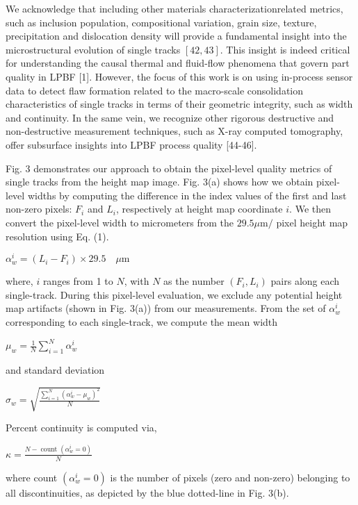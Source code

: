 \documentclass[10pt]{article}
\begin{document}
We acknowledge that including other materials characterizationrelated metrics, such as inclusion population, compositional variation, grain size, texture, precipitation and dislocation density will provide a fundamental insight into the microstructural evolution of single tracks $[42,43]$. This insight is indeed critical for understanding the causal thermal and fluid-flow phenomena that govern part quality in LPBF [1]. However, the focus of this work is on using in-process sensor data to detect flaw formation related to the macro-scale consolidation characteristics of single tracks in terms of their geometric integrity, such as width and continuity. In the same vein, we recognize other rigorous destructive and non-destructive measurement techniques, such as X-ray computed tomography, offer subsurface insights into LPBF process quality [44-46].

Fig. 3 demonstrates our approach to obtain the pixel-level quality metrics of single tracks from the height map image. Fig. 3(a) shows how we obtain pixel-level widths by computing the difference in the index values of the first and last non-zero pixels: $F_{i}$ and $L_{i}$, respectively at height map coordinate $i$. We then convert the pixel-level width to micrometers from the $29.5 \mu \mathrm{m} /$ pixel height map resolution using Eq. (1).

$\alpha_{w}^{i}=\left(L_{i}-F_{i}\right) \times 29.5 \quad \mu \mathrm{m}$

where, $i$ ranges from 1 to $N$, with $N$ as the number $\left(F_{i}, L_{i}\right)$ pairs along each single-track. During this pixel-level evaluation, we exclude any potential height map artifacts (shown in Fig. 3(a)) from our measurements. From the set of $\alpha_{w}^{i}$ corresponding to each single-track, we compute the mean width

$\mu_{w}=\frac{1}{N} \sum_{i=1}^{N} \alpha_{w}^{i}$

and standard deviation

$\sigma_{w}=\sqrt{\frac{\sum_{i=1}^{N}\left(\alpha_{w}^{i}-\mu_{w}\right)^{2}}{N}}$

Percent continuity is computed via,

$\kappa=\frac{N-\operatorname{count}\left(\alpha_{w}^{i}=0\right)}{N}$

where count $\left(\alpha_{w}^{i}=0\right)$ is the number of pixels (zero and non-zero) belonging to all discontinuities, as depicted by the blue dotted-line in Fig. 3(b).
\end{document}

